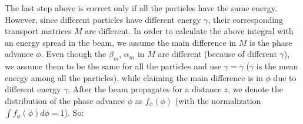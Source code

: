 \documentclass[%
reprint, superscriptaddress,
 amsmath,amssymb, aps,
prstab,
]{revtex4-2}
\begin{document}
The last step above is correct only if all the particles have the same
energy. However, since different particles have different energy
$\gamma$, their corresponding transport matrices $M$ are different. In
order to calculate the above integral with an energy spread in the beam, we assume the main difference in
$M$ is the phase advance $\phi$. Even though the $\beta_m$, $\alpha_m$
in $M$ are different (because of different $\gamma$), we assume them to
be the same for all the particles and use $\gamma = \bar \gamma$ ($\bar
\gamma$ is the mean energy among all the particles), while claiming the
main difference is in $\phi$ due to different energy $\gamma$. After the beam propagates for a distance $z$, we
denote the distribution of
the phase advance $\phi$ as $f_{\phi}(\phi)$ (with the normalization
$\int f_{\phi}(\phi) d \phi=1$). So: 
\end{document}
